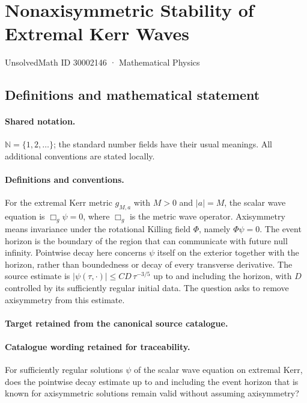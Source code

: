 \documentclass[11pt]{article}
\begin{document}
\setcounter{section}{30002145}
\section{Nonaxisymmetric Stability of Extremal Kerr Waves}\label{30002146}
{\small UnsolvedMath ID 30002146 · Mathematical Physics}
\subsection{Definitions and mathematical statement}

\paragraph{Shared notation.}$\mathbb N=\{1,2,\ldots\}$; the standard number fields have their usual meanings. All additional conventions are stated locally.


\paragraph{Definitions and conventions.}
For the extremal Kerr metric $g_{M,a}$ with $M>0$ and $|a|=M$, the scalar wave equation is $\Box_g\psi=0$, where $\Box_g$ is the metric wave operator. Axisymmetry means invariance under the rotational Killing field $\Phi$, namely $\Phi\psi=0$. The event horizon is the boundary of the region that can communicate with future null infinity. Pointwise decay here concerns $\psi$ itself on the exterior together with the horizon, rather than boundedness or decay of every transverse derivative. The source estimate is $|\psi(\tau,\cdot)|\leq CD\,\tau^{-3/5}$ up to and including the horizon, with $D$ controlled by its sufficiently regular initial data. The question asks to remove axisymmetry from this estimate.

\paragraph{Target retained from the canonical source catalogue.}
\paragraph{Catalogue wording retained for traceability.}
For sufficiently regular solutions $\psi$ of the scalar wave equation on extremal Kerr, does the pointwise decay estimate up to and including the event horizon that is known for axisymmetric solutions remain valid without assuming axisymmetry?
\end{document}
